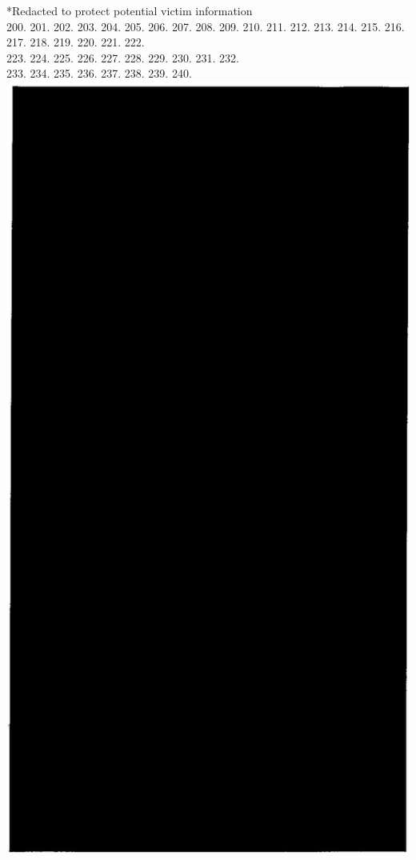 \documentclass[10pt]{article}
\begin{document}
*Redacted to protect potential victim information\\
200. 201. 202. 203. 204. 205. 206. 207. 208. 209. 210. 211. 212. 213. 214. 215. 216. 217. 218. 219. 220. 221. 222.\\
223. 224. 225. 226. 227. 228. 229. 230. 231. 232.\\
233. 234. 235. 236. 237. 238. 239. 240.\\
\includegraphics[max width=\textwidth, center]{2025_02_27_dd68c3d38de88f0516d9g-223}\\
\end{document}
